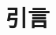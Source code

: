 \documentclass[
    lang=cn,
]{spArticle}
\date{}
\begin{document}
    \section{引言}
    
\end{document}
